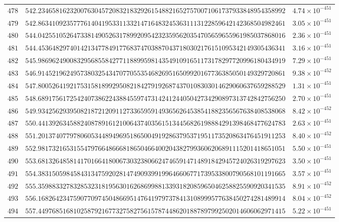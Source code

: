 \documentclass[12pt,reqno]{amsart}
\theoremstyle{remark}
\begin{document}
\begin{longtable}{clc}
$478$ & $542.2346581623200763045720832183292615488216527570071061737933848954358992$ & $4.74\times 10^{-451}$ \\
$479$ & $542.8634109235777614041953311332147164832453631113122859642142368504982461$ & $3.05\times 10^{-451}$ \\
$480$ & $544.0425510526473381490526317899209542323595620354705659655961985037868016$ & $2.36\times 10^{-451}$ \\
$481$ & $544.4536482974014213477849177683747038870437180302176151095342149305436341$ & $3.16\times 10^{-451}$ \\
$482$ & $545.9869624900832956855842771188995981435491091651173178297720996180434919$ & $7.29\times 10^{-451}$ \\
$483$ & $546.9145219624957380325434707705535468269516509920167736385050149329720861$ & $9.38\times 10^{-452}$ \\
$484$ & $547.8005264192175315818992950821842791926874370108303014629060637659288529$ & $1.31\times 10^{-451}$ \\
$485$ & $548.6891756172542407386224388455974731424124405042734290897313742842756250$ & $2.70\times 10^{-451}$ \\
$486$ & $549.9342562939508218721209112733659591493656264538541882356567638408538068$ & $8.42\times 10^{-452}$ \\
$487$ & $550.4413926345882408789161210064374035615134456826198884291398468477624783$ & $2.63\times 10^{-451}$ \\
$488$ & $551.2013740779780605344894969518650049192863795371951173520863476451911253$ & $8.40\times 10^{-452}$ \\
$489$ & $552.9817321653155479766486668186504664002043827993606206891115201418651051$ & $5.50\times 10^{-451}$ \\
$490$ & $553.6813264858141701664180067303238066247465914714891842945724026319297623$ & $3.50\times 10^{-451}$ \\
$491$ & $554.3831505984584313475920281474909399199646606771739533800790568101191665$ & $3.57\times 10^{-451}$ \\
$492$ & $555.3598833278328532318195630162686998813393182085965046258825590920341535$ & $8.91\times 10^{-452}$ \\
$493$ & $556.1682642347590770974504866951476419797378413108999577638450274281489914$ & $8.04\times 10^{-452}$ \\
$494$ & $557.4497685168102587921677327582756157874486201887897992502014606062971415$ & $5.22\times 10^{-451}$ \\

\end{longtable}
\end{document}
